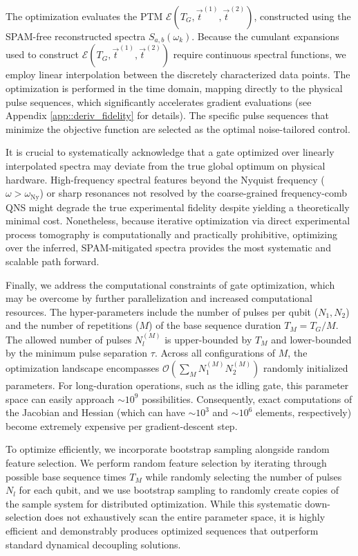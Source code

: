 \documentclass[%
 reprint,
superscriptaddress,
 amsmath,amssymb,
 aps,
pra,
]{revtex4-2}
\begin{document}
The optimization evaluates the PTM $\mathcal{E}(T_G, \vec{t}^{(1)}, \vec{t}^{(2)})$, constructed using the SPAM-free reconstructed spectra $S_{a,b}(\omega_k)$. Because the cumulant expansions used to construct $\mathcal{E}(T_G, \vec{t}^{(1)}, \vec{t}^{(2)})$ require continuous spectral functions, we employ linear interpolation between the discretely characterized data points. The optimization is performed in the time domain, mapping directly to the physical pulse sequences, which significantly accelerates gradient evaluations (see Appendix \ref{app::deriv_fidelity} for details). The specific pulse sequences that minimize the objective function are selected as the optimal noise-tailored control.

It is crucial to systematically acknowledge that a gate optimized over linearly interpolated spectra may deviate from the true global optimum on physical hardware. High-frequency spectral features beyond the Nyquist frequency ($\omega > \omega_{\text{Ny}}$) or sharp resonances not resolved by the coarse-grained frequency-comb QNS might degrade the true experimental fidelity despite yielding a theoretically minimal cost. Nonetheless, because iterative optimization via direct experimental process tomography is computationally and practically prohibitive, optimizing over the inferred, SPAM-mitigated spectra provides the most systematic and scalable path forward. 

Finally, we address the computational constraints of gate optimization, which may be overcome by further parallelization and increased computational resources. The hyper-parameters include the number of pulses per qubit ($N_1, N_2$) and the number of repetitions ($M$) of the base sequence duration $T_M = T_G/M$. The allowed number of pulses $N_l^{(M)}$ is upper-bounded by $T_M$ and lower-bounded by the minimum pulse separation $\tau$. Across all configurations of $M$, the optimization landscape encompasses $\mathcal{O}(\sum_M N_1^{(M)}N_2^{(M)})$ randomly initialized parameters. For long-duration operations, such as the idling gate, this parameter space can easily approach $\sim 10^9$ possibilities. Consequently, exact computations of the Jacobian and Hessian (which can have $\sim 10^3$ and $\sim 10^6$ elements, respectively) become extremely expensive per gradient-descent step. 

To optimize efficiently, we incorporate bootstrap sampling alongside random feature selection. We perform random feature selection by iterating through possible base sequence times $T_M$ while randomly selecting the number of pulses $N_l$ for each qubit, and we use bootstrap sampling to randomly create copies of the sample system for distributed optimization. While this systematic down-selection does not exhaustively scan the entire parameter space, it is highly efficient and demonstrably produces optimized sequences that outperform standard dynamical decoupling solutions. 
\end{document}
